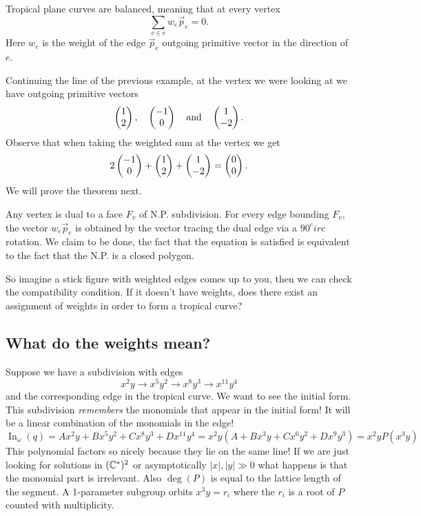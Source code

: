 \documentclass[12pt]{memoir}
\begin{document}
\begin{Th}
Tropical plane curves are balanced, meaning that at every vertex
$$\sum_{v\in e}w_e\vec p_e=0.$$
Here $w_e$ is the weight of the edge $\vec p_e$ outgoing primitive vector in the direction of $e$.
\end{Th}

Continuing the line of the previous example, at the vertex we were looking at we have outgoing primitive vectors 
$$\begin{pmatrix} 1 \\ 2 \end{pmatrix},\quad\begin{pmatrix} -1 \\ 0 \end{pmatrix}\quad\text{and}\quad\begin{pmatrix} 1 \\ -2 \end{pmatrix}.$$
Observe that when taking the weighted sum at the vertex we get 
$$2\begin{pmatrix} -1 \\ 0 \end{pmatrix}+\begin{pmatrix} 1 \\ 2 \end{pmatrix}+\begin{pmatrix} 1 \\ -2 \end{pmatrix}=\begin{pmatrix} 0 \\ 0 \end{pmatrix}.$$
We will prove the theorem next.

\begin{ptcbp}
Any vertex is dual to a face $F_v$ of N.P. subdivision.
For every edge bounding $F_v$, the vector $w_e\vec p_e$ is obtained by the vector tracing the dual edge via a $90^circ$ rotation. We claim to be done, the fact that the equation is satisfied is equivalent to the fact that the N.P. is a closed polygon.
\end{ptcbp}

So imagine a stick figure with weighted edges comes up to you, then we can check the compatibility condition. If it doesn't have weights, does there exist an assignment of weights in order to form a tropical curve? 

\subsection{What do the weights mean?}

\begin{Ex}
    Suppose we have a subdivision with edges 
    $$x^2y\to x^5y^2\to x^8y^3\to x^11y^4$$
    and the corresponding edge in the tropical curve. We want to see the initial form. This subdivision \emph{remembers} the monomials that appear in the initial form! It will be a linear combination of the monomials in the edge!
    $$\operatorname{In}_\omega(q)=Ax^2y+Bx^5y^2+Cx^8y^3+Dx^{11}y^4=x^2y(A+Bx^3y+Cx^6y^2+Dx^9y^3)=x^2yP(x^3y)$$
    This polynomial factors so nicely because they lie on the same line! If we are just looking for solutions in $(\mathbb{C}^\ast)^2$ or asymptotically $|x|,|y|\gg 0$ what happens is that the monomial part is irrelevant. Also $\deg(P)$ is equal to the lattice length of the segment. A 1-parameter subgroup orbits $x^3y=r_i$ where the $r_i$ is a root of $P$ counted with multiplicity.    
\end{Ex}
\end{document}
